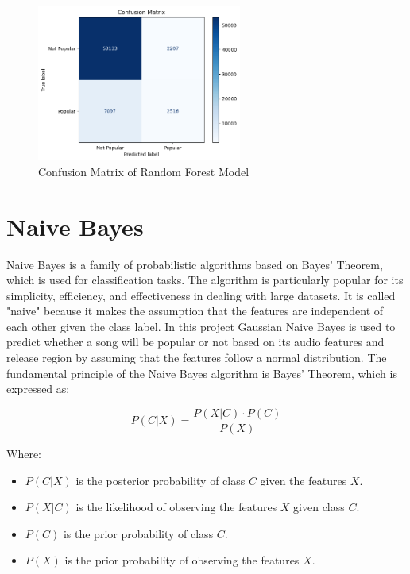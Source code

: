 \begin{figure}[h] 
    \centering 
    \includegraphics[width=0.6\textwidth]{media/random_forest_conf_matrix.png}
    \caption{Confusion Matrix of Random Forest Model}

\end{figure}




\section{Naive Bayes}
Naive Bayes is a family of probabilistic algorithms based on Bayes' Theorem, which is used for classification tasks.
The algorithm is particularly popular for its simplicity, efficiency, and effectiveness in dealing with large datasets.
It is called "naive" because it makes the assumption that the features are independent of each other given the class label.
In this project Gaussian Naive Bayes is used to predict whether a song will be popular or not based on its audio features and release region by assuming that
the features follow a normal distribution. The fundamental principle of the Naive Bayes algorithm is Bayes' Theorem, which is expressed as:

\[
P(C | X) = \frac{P(X | C) \cdot P(C)}{P(X)}
\]

Where:
\begin{itemize}
    \item \( P(C | X) \) is the posterior probability of class \( C \) given the features \( X \).
    \item \( P(X | C) \) is the likelihood of observing the features \( X \) given class \( C \).
    \item \( P(C) \) is the prior probability of class \( C \).
    \item \( P(X) \) is the prior probability of observing the features \( X \).
\end{itemize}

